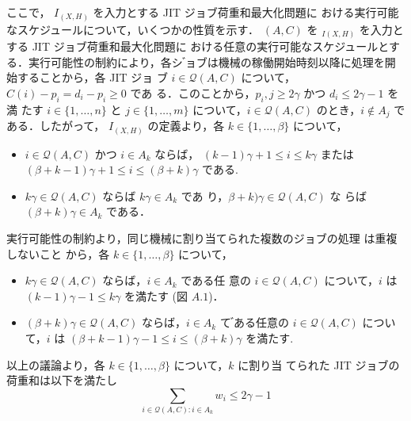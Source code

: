 \documentclass[12pt]{optlab-bachelor}
\begin{document}
ここで， $I_{(X,H)}$ を入力とする JIT ジョブ荷重和最大化問題に
おける実行可能なスケジュールについて，いくつかの性質を示す．
$(A, C)$ を $_{I(X,H)}$ を入力とする JIT ジョブ荷重和最大化問題に
おける任意の実行可能なスケジュールとする．実行可能性の制約により，各シ
゙ョブは機械の稼働開始時刻以降に処理を開始することから，各 JIT ジョ
ブ $i \in \mathcal{Q}(A,C)$ について，$C(i) − p_i = d_i − p_i \ge 0$ であ
る．このことから，$p_i,j \ge 2\gamma$ かつ $d_i \le 2\gamma − 1$ を満
たす $i \in \{1,\ldots,n\}$ と $j \in \{1,\ldots,m\}$ について，$i \in
\mathcal{Q}(A,C)$ のとき，$i \notin A_j$ である．したがって，
$I_{(X,H)}$ の定義より，各 $k \in \{1,\ldots,\beta\}$ について，
\begin{itemize}
  \item $i \in \mathcal{Q}(A,C)$ かつ $i \in A_k$ ならば，
  $(k − 1)\gamma + 1 \le i \le k\gamma$ または $(\beta + k − 1)\gamma +
  1 \le i \le (\beta + k)\gamma$ である.
  \item $k\gamma \in \mathcal{Q}(A,C)$ ならば $k\gamma \in A_k$ であ
  り，$\beta + k)\gamma \in \mathcal{Q}(A,C)$ な
  らば $(\beta + k)\gamma \in A_k$ である．
\end{itemize}
実行可能性の制約より，同じ機械に割り当てられた複数のジョブの処理
は重複しないこと から，各 $k \in \{1,\ldots,\beta\}$ について，
\begin{itemize}
  \item $k\gamma \in \mathcal{Q}(A,C)$ ならば，$i \in A_k$ である任
  意の $i \in \mathcal{Q}(A,C)$ について，$i$ は \\$(k − 1)\gamma− 1
  \le k\gamma$ を満たす (図 $A.1$)．
  \item $(\beta + k)\gamma \in \mathcal{Q}(A,C)$ ならば，$i \in A_k$ て
  ゙ある任意の $i \in \mathcal{Q}(A,C)$ について，$i$ は
  $(\beta + k − 1)\gamma − 1 \le i \le (\beta + k)\gamma$ を満たす.
\end{itemize}
以上の議論より，各 $k \in \{1,\ldots, \beta \}$ について，$k$ に割り当
てられた JIT ジョブの荷重和は以下を満たし
\begin{equation}
  \sum_{i \in \mathcal{Q}(A,C):i \in A_k}w_i \le
  2\gamma - 1 \tag{A.1}
\end{equation}
\end{document}
